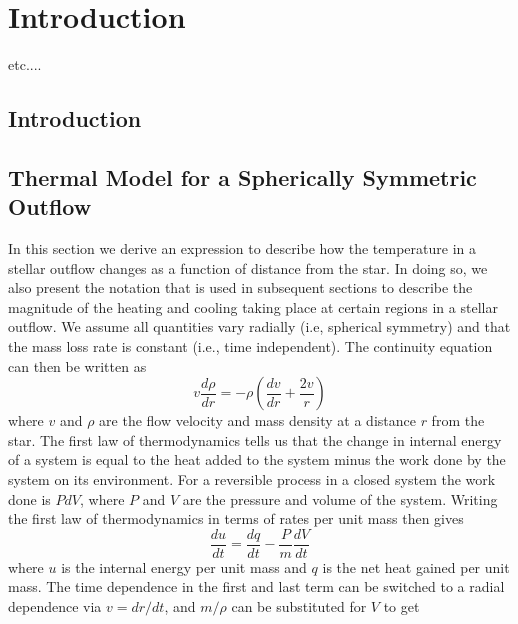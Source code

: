 \chapter{Introduction}
\label{chap:7}


etc....

\section{Introduction}\label{sec:1}

 

\section{Thermal Model for a Spherically Symmetric Outflow}\label{sec:2}
In this section we derive an expression to describe how the temperature in a stellar outflow changes as a function of distance from the star. In doing so, we also present the notation that is used in subsequent sections to describe the magnitude of the heating and cooling taking place at certain regions in a stellar outflow. We assume all quantities vary radially (i.e, spherical symmetry) and that the mass loss rate is constant (i.e., time independent). The continuity equation can then be written as
\begin{equation}
\label{eq:1}
v\frac{d\rho}{dr}=-\rho \left(\frac{dv}{dr}+\frac{2v}{r} \right)
\end{equation}
where $v$ and $\rho$ are the flow velocity and mass density at a distance $r$ from the star. The first law of thermodynamics tells us that the change in internal energy of a system is equal to the heat added to the system minus the work done by the system on its environment. For a reversible process in a closed system the work done is $PdV$, where $P$ and $V$ are the pressure and volume of the system. Writing the first law of thermodynamics in terms of rates per unit mass then gives
\begin{equation}
\frac{du}{dt}=\frac{dq}{dt}-\frac{P}{m}\frac{dV}{dt}
\end{equation}
where $u$ is the internal energy per unit mass and $q$ is the net heat gained per unit mass. The time dependence in the first and last term can be switched to a radial dependence via $v=dr/dt$, and $m/\rho$ can be substituted for $V$ to get
